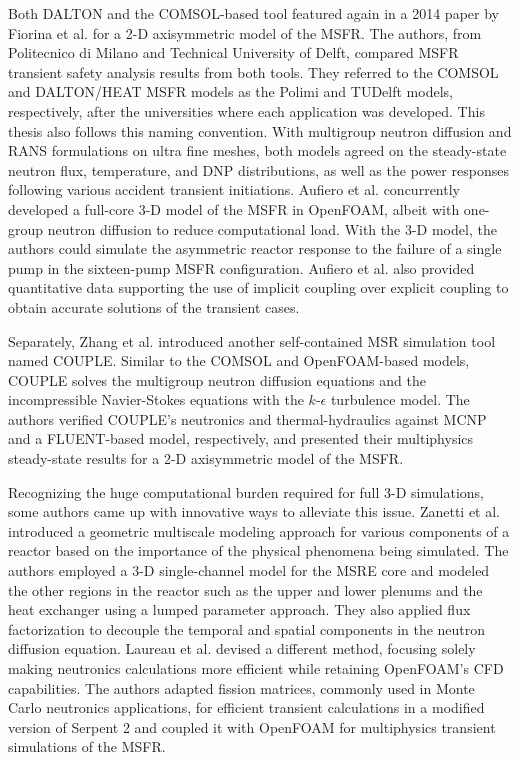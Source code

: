 Both DALTON and the COMSOL-based tool featured again in a 2014 paper by
Fiorina et al. \cite{fiorina_modelling_2014} for a 2-D axisymmetric
model of the \gls{MSFR}. The authors, from Politecnico di Milano and
Technical University of Delft, compared \gls{MSFR} transient safety
analysis results from both tools. They referred to the COMSOL and DALTON/HEAT
\gls{MSFR} models as the Polimi and TUDelft models, respectively, after the
universities where each application was developed. This thesis also follows
this naming convention. With
multigroup neutron diffusion and \gls{RANS} formulations on ultra fine meshes,
both models agreed on the steady-state neutron flux, temperature,
and \gls{DNP} distributions, as well as the power responses following various
accident transient initiations.
Aufiero et al. \cite{aufiero_development_2014} concurrently developed
a full-core 3-D model of the \gls{MSFR} in OpenFOAM, albeit with one-group
neutron diffusion to reduce computational load. With the 3-D model, the
authors could simulate the asymmetric reactor response to the failure of a
single pump in the sixteen-pump \gls{MSFR} configuration. Aufiero et al. also
provided quantitative data supporting the use of implicit coupling over
explicit coupling to obtain accurate solutions of the transient cases.

Separately, Zhang et al. \cite{zhang_couple_2014} introduced another
self-contained \gls{MSR} simulation tool named COUPLE. Similar to the COMSOL
and OpenFOAM-based models, COUPLE solves the multigroup neutron diffusion
equations and the incompressible Navier-Stokes equations with the
$k$-$\epsilon$ turbulence model. The authors verified COUPLE's neutronics and
thermal-hydraulics against MCNP and a FLUENT-based model, respectively, and
presented their multiphysics steady-state results for a 2-D axisymmetric
model of the \gls{MSFR}.

Recognizing the huge computational burden required for full 3-D simulations, 
some authors came up with innovative ways to alleviate this issue. Zanetti et
al. \cite{zanetti_geometric_2015} introduced a geometric multiscale modeling
approach for various components of a reactor based on the importance of
the physical phenomena being simulated. The authors employed a 3-D 
single-channel model for the \gls{MSRE} core and modeled the other
regions in the reactor such as the upper and lower plenums and the heat
exchanger using a lumped parameter approach. They also applied flux
factorization to decouple the temporal and spatial components in the neutron
diffusion equation. Laureau et al. \cite{laureau_transient_2017} devised a
different method, focusing solely making neutronics calculations more
efficient while retaining OpenFOAM's \gls{CFD} capabilities. The authors
adapted fission matrices, commonly used in Monte Carlo neutronics
applications, for efficient transient calculations in a modified version of
Serpent 2 \cite{leppanen_serpent_2014} and coupled it with OpenFOAM for
multiphysics transient simulations of the \gls{MSFR}.

